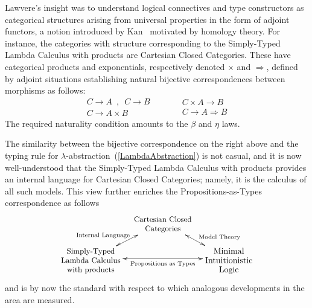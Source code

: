 \documentclass[11pt,twocolumn]{article}
\newcommand{\vfigspace}[1]{}%
\begin{document}
Lawvere's insight was to understand logical connectives and type
constructors as categorical structures arising from universal properties
in the form of adjoint functors, a notion introduced by Kan~\cite{Kan}
motivated by homology theory.  For instance, the categories with structure
corresponding to the Simply-Typed Lambda Calculus with products are
Cartesian Closed Categories.  These have categorical products and
exponentials, respectively denoted $\times$ and $\Rightarrow$, defined by
adjoint situations establishing natural bijective correspondences between
morphisms as follows:
\[
  \begin{array}{c}
    C\to A \enspace,\enspace C\to B
    \\ \hline\hline
    C\to A\times B
  \end{array}
  \quad\qquad
  \begin{array}{c}
    C\times A\to B
    \\ \hline\hline
    C\to A\Rightarrow B
  \end{array}
\]
The required naturality condition amounts to the $\beta$ and $\eta$ laws.

The similarity between the bijective correspondence on the right above and the
typing rule for \mbox{$\lambda$-abstraction}~(\ref{LambdaAbstraction}) is not
casual, and it is now well-understood that the Simply-Typed Lambda Calculus
with products provides an internal language for Cartesian Closed Categories;
namely, it is the calculus of all such models.  This view further enriches the
Propositions-as-Types correspondence as 
follows %
\[\xymatrix@C=10pt@R=12.5pt{
    & \ar@{<->}[dl]_(.5){\null\hspace*{-15mm}\txt{\scriptsize Internal
        Language}} 
    \ar@{<->}[dr]^(.55){\null\hspace*{4mm}\txt{\scriptsize Model Theory}}
    \txt{\small Cartesian Closed\\ \small Categories} & \\
    \txt{\small Simply-Typed\\ \small Lambda Calculus\\ \small with products}
    \ar@{<->}[rr]_-{\txt{\scriptsize Propositions as Types}} & & 
    \txt{Minimal\\ Intuitionistic\\ Logic}
  }\]
and is by now the standard with respect to which analogous developments in the
area are measured.  
\end{document}
